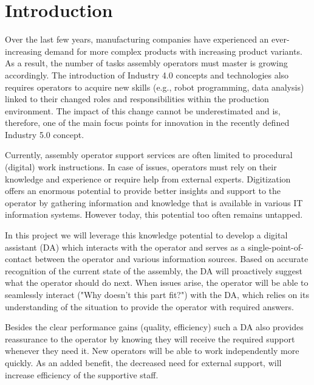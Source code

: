 \section{Introduction}\label{sec:Introduction}

Over the last few years, manufacturing companies have experienced an ever-increasing demand for more complex products with increasing product variants. As a result, the number of tasks assembly operators must master is growing accordingly. The introduction of Industry 4.0 concepts and technologies also requires operators to acquire new skills (e.g., robot programming, data analysis) linked to their changed roles and responsibilities within the production environment. The impact of this change cannot be underestimated and is, therefore, one of the main focus points for innovation in the recently defined Industry 5.0 concept. 

Currently, assembly operator support services are often limited to procedural (digital) work instructions. In case of issues, operators must rely on their knowledge and experience or require help from external experts. Digitization offers an enormous potential to provide better insights and support to the operator by gathering information and knowledge that is available in various IT information systems. However today, this potential too often remains untapped. 

In this project we will leverage this knowledge potential to develop a digital assistant (DA) which interacts with the operator and serves as a single-point-of-contact between the operator and various information sources. Based on accurate recognition of the current state of the assembly, the DA will proactively suggest what the operator should do next. When issues arise, the operator will be able to seamlessly interact ("Why doesn't this part fit?") with the DA, which relies on its understanding of the situation to provide the operator with required answers. 

Besides the clear performance gains (quality, efficiency) such a DA also provides reassurance to the operator by knowing they will receive the required support whenever they need it. New operators will be able to work independently more quickly. As an added benefit, the decreased need for external support, will increase efficiency of the supportive staff.
